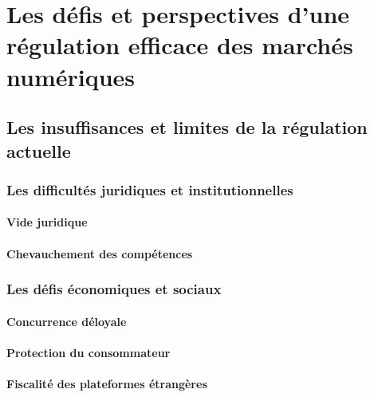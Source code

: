 
\part{Les défis et perspectives d’une régulation efficace des marchés numériques}

\chapter{Les insuffisances et limites de la régulation actuelle}

\section{Les difficultés juridiques et institutionnelles}

\subsection{Vide juridique}


\subsection{Chevauchement des compétences}


\section{Les défis économiques et sociaux}

\subsection{Concurrence déloyale}


\subsection{Protection du consommateur}


\subsection{Fiscalité des plateformes étrangères}

